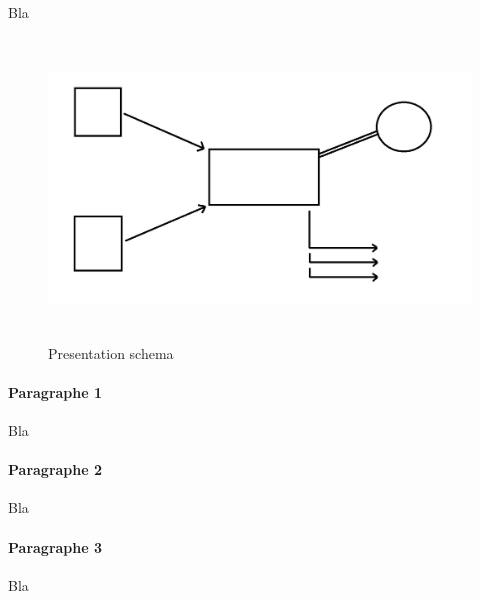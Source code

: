 Bla

\begin{figure}[!ht]
\begin{center}
\includegraphics[height=8cm]{presentation/schema}
\end{center}
\caption[schema]{Presentation schema}
\end{figure}

\paragraph*{Paragraphe 1}

\hskip7mm

Bla

\paragraph*{Paragraphe 2}

\hskip7mm

Bla

\paragraph*{Paragraphe 3}

\hskip7mm

Bla